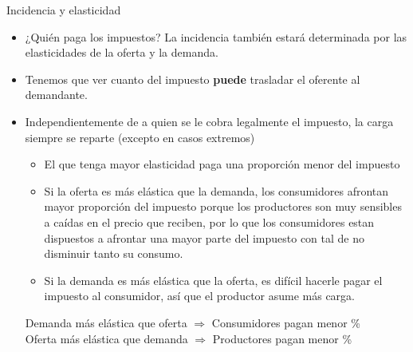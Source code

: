 \documentclass{beamer}
\begin{document}
\begin{frame}{Incidencia y elasticidad}
    \begin{itemize}
        \item ¿Quién paga los impuestos? La incidencia también estará determinada por las elasticidades de la oferta y la demanda. 
        \item Tenemos que ver cuanto del impuesto \textbf{puede} trasladar el oferente al demandante.
        \item Independientemente de a quien se le cobra legalmente el impuesto, la carga siempre se reparte (excepto en casos extremos)
            \begin{itemize}
                \item El que tenga mayor elasticidad paga una proporción menor del impuesto
                \item Si la oferta es más elástica que la demanda, los consumidores afrontan mayor proporción del impuesto porque los productores son muy sensibles a caídas en el precio que reciben, por lo que los consumidores estan dispuestos a afrontar una mayor parte del impuesto con tal de no disminuir tanto su consumo.
                \item Si la demanda es más elástica que la oferta, es difícil hacerle pagar el impuesto al consumidor, así que el productor asume más carga.
            \end{itemize}
        \begin{boxB}
        \small
        \centering
        Demanda más elástica que oferta  $\Longrightarrow$ Consumidores pagan menor \% \\
        Oferta más elástica que demanda  $\Longrightarrow$ Productores pagan menor \%
        \end{boxB}
    \end{itemize}
\end{frame}
\end{document}
